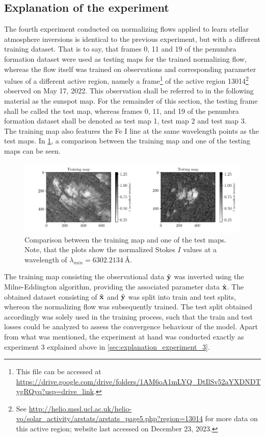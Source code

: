 \documentclass[a4paper,12pt]{report}
\begin{document}
\subsection{Explanation of the experiment}
The fourth experiment conducted on normalizing flows applied to learn stellar atmosphere inversions is identical to the previous experiment, but with a different training dataset. That is to say, that frames 0, 11 and 19 of the penumbra formation dataset were used as testing maps for the trained normalizing flow, whereas the flow itself was trained on observations and corresponding parameter values of a different active region, namely a frame\footnote{This file can be accessed at \url{https://drive.google.com/drive/folders/1AM6oA1mLYQ_DtIlSv52aYXDNDTygRQyq?usp=drive_link}.} of the active region 13014\footnote{See \url{http://helio.mssl.ucl.ac.uk/helio-vo/solar_activity/arstats/arstats_page5.php?region=13014} for more data on this active region; website last accessed on December 23, 2023.} observed on May 17, 2022. This observation shall be referred to in the following material as the sunspot map. For the remainder of this section, the testing frame shall be called the test map, whereas frames 0, 11, and 19 of the penumbra formation dataset shall be denoted as test map 1, test map 2 and test map 3. The training map also features the Fe I line at the same wavelength points as the test maps. In \cref{fig:nf-milne-eddington-example-4-trainingmap-testingmap-nflows-piecewisequadratic}, a comparison between the training map and one of the testing maps can be seen.
\begin{figure}[h]
\centering
\includegraphics[width=\textwidth]{figures/nf-milne-eddington-example-4-trainingmap-testingmap-nflows-piecewisequadratic.pdf}
\caption{Comparison between the training map and one of the test maps. Note, that the plots show the normalized Stokes $I$ values at a wavelength of $\lambda_{min} = \SI{6302.2134}{\angstrom}$.}
\label{fig:nf-milne-eddington-example-4-trainingmap-testingmap-nflows-piecewisequadratic}
\end{figure}
The training map consisting the observational data $\hat{\boldsymbol{\mathbf{y}}}$ was inverted using the Milne-Eddington algorithm, providing the associated parameter data $\hat{\boldsymbol{\mathbf{x}}}$. The obtained dataset consisting of $\hat{\boldsymbol{\mathbf{x}}}$ and $\hat{\boldsymbol{\mathbf{y}}}$ was split into train and test splits, whereon the normalizing flow was subsequently trained. The test split obtained accordingly was solely used in the training process, such that the train and test losses could be analyzed to assess the convergence behaviour of the model. Apart from what was mentioned, the experiment at hand was conducted exactly as experiment 3 explained above in \cref{sec:explanation_experiment_3}.
\end{document}
